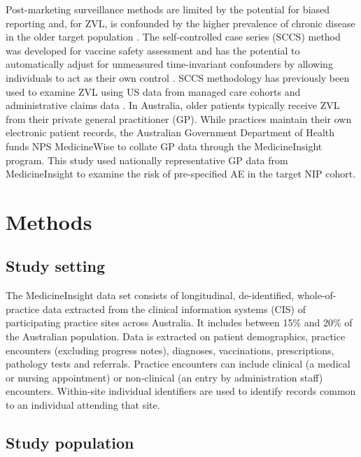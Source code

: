 \documentclass[review, endfloat]{elsarticle}
\begin{document}
Post-marketing surveillance methods are limited by the potential for biased reporting and, for ZVL, is confounded by the higher prevalence of chronic disease in the older target population \citep{miller2018post}. The self-controlled case series (SCCS) method was developed for vaccine safety assessment and has the potential to automatically adjust for unmeasured time-invariant confounders by allowing individuals to act as their own control \citep{petersen2016}. SCCS methodology has previously been used to examine ZVL using US data from managed care cohorts \citep{tseng2012} and administrative claims data \citep{minassian2015}. In Australia, older patients typically receive ZVL from their private general practitioner (GP). While practices maintain their own electronic patient records, the Australian Government Department of Health funds NPS MedicineWise to collate GP data through the MedicineInsight program. This study used nationally representative GP data from MedicineInsight to examine the risk of pre-specified AE in the target NIP cohort.

\section{Methods}

\subsection{Study setting}

The MedicineInsight data set consists of longitudinal, de-identified, whole-of-practice data extracted from the clinical information systems (CIS) of participating practice sites across Australia. It includes between 15\% and 20\% of the Australian population.  Data is extracted on patient demographics, practice encounters (excluding progress notes), diagnoses, vaccinations, prescriptions, pathology tests and referrals. Practice encounters can include clinical (a medical or nursing appointment) or non-clinical (an entry by administration staff) encounters. Within-site individual identifiers are used to identify records common to an individual attending that site. 

\subsection{Study population}
\end{document}
